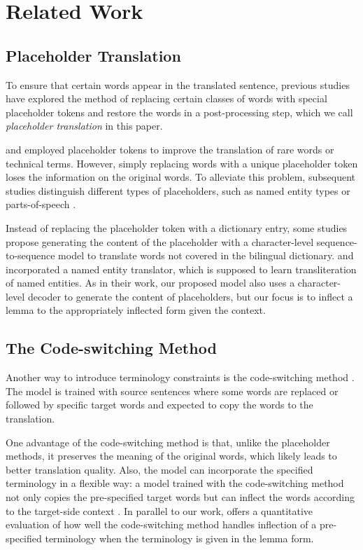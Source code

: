 \section{Related Work}
\subsection{Placeholder Translation}
To ensure that certain words appear in the translated sentence, previous studies have explored the method of replacing certain classes of words with special placeholder tokens and restore the words in a post-processing step, which we call {\it placeholder translation} in this paper.

\citet{luong-etal-2015-addressing} and \citet{long-etal-2016-translation} employed placeholder tokens to improve the translation of rare words or technical terms.
However, simply replacing words with a unique placeholder token loses the information on the original words. To alleviate this problem, subsequent studies distinguish different types of placeholders, such as named entity types \citep{Crego2016SYSTRANsPN,post-etal-2019-exploration} or parts-of-speech \citep{michon-etal-2020-integrating}.

Instead of replacing the placeholder token with a dictionary entry, some studies propose generating the content of the placeholder with a character-level sequence-to-sequence model to translate words not covered in the bilingual dictionary. \citet{Li2016NeuralNT} and \citet{wang-etal-2017-sogou} incorporated a named entity translator, which is supposed to learn transliteration of named entities.
As in their work, our proposed model also uses a character-level decoder to generate the content of placeholders, but our focus is to inflect a lemma to the appropriately inflected form given the context.

\subsection{The Code-switching Method}
Another way to introduce terminology constraints is the code-switching method \citep{song-etal-2019-code,dinu-etal-2019-training,exel-etal-2020-terminology}. The model is trained with source sentences where some words are replaced or followed by specific target words and expected to copy the words to the translation.

One advantage of the code-switching method is that, unlike the placeholder methods, it preserves the meaning of the original words, which likely leads to better translation quality.
Also, the model can incorporate the specified terminology in a flexible way: a model trained with the code-switching method not only copies the pre-specified target words but can inflect the words according to the target-side context \citep{dinu-etal-2019-training}.
In parallel to our work, \citet{niehues-2021-continuous} offers a quantitative evaluation of how well the code-switching method handles inflection of a pre-specified terminology when the terminology is given in the lemma form.

